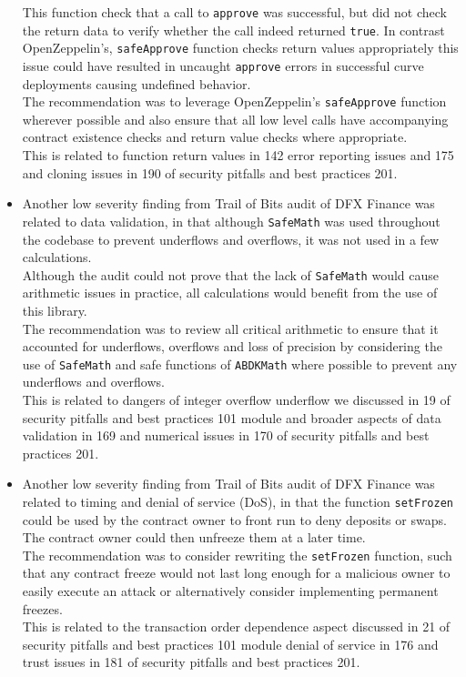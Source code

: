 \begin{itemize}
  This function check that a call to \texttt{approve} was successful,
  but did not check the return data to verify whether the call indeed
  returned \texttt{true}. In contrast OpenZeppelin's,
  \texttt{safeApprove} function checks return values appropriately this
  issue could have resulted in uncaught \texttt{approve} errors in
  successful curve deployments causing undefined behavior.\\

  The recommendation was to leverage OpenZeppelin's \texttt{safeApprove}
  function wherever possible and also ensure that all low level calls
  have accompanying contract existence checks and return value checks
  where appropriate.\\

  This is related to function return values in 142 error reporting
  issues and 175 and cloning issues in 190 of security pitfalls and best
  practices 201.
\item
  Another low severity finding from Trail of Bits audit of DFX Finance
  was related to data validation, in that although \texttt{SafeMath} was
  used throughout the codebase to prevent underflows and overflows, it
  was not used in a few calculations.\\

  Although the audit could not prove that the lack of \texttt{SafeMath}
  would cause arithmetic issues in practice, all calculations would
  benefit from the use of this library.\\

  The recommendation was to review all critical arithmetic to ensure
  that it accounted for underflows, overflows and loss of precision by
  considering the use of \texttt{SafeMath} and safe functions of
  \texttt{ABDKMath} where possible to prevent any underflows and
  overflows.\\

  This is related to dangers of integer overflow underflow we discussed
  in 19 of security pitfalls and best practices 101 module and broader
  aspects of data validation in 169 and numerical issues in 170 of
  security pitfalls and best practices 201.
\item
  Another low severity finding from Trail of Bits audit of DFX Finance
  was related to timing and denial of service (DoS), in that the
  function \texttt{setFrozen} could be used by the contract owner to
  front run to deny deposits or swaps. The contract owner could then
  unfreeze them at a later time.\\

  The recommendation was to consider rewriting the \texttt{setFrozen}
  function, such that any contract freeze would not last long enough for
  a malicious owner to easily execute an attack or alternatively
  consider implementing permanent freezes.\\

  This is related to the transaction order dependence aspect discussed
  in 21 of security pitfalls and best practices 101 module denial of
  service in 176 and trust issues in 181 of security pitfalls and best
  practices 201.
\end{itemize}

